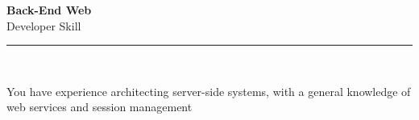 \documentclass[11pt,a4paper]{memoir}
\begin{document}
    \begin{Spacing}{0.75}%
        \noindent
        \Large
        \textbf{Back-End Web}\\[3pt]
        \scriptsize\color{gray}Developer Skill\\ 
        \rule{\textwidth}{.3mm}\\
        
        \vspace{3mm}
        \noindent
        \begin{minipage}[t]{53mm}
            \begin{flushleft}
            {
                \normalsize
                \begin{Spacing}{1}%
                \color{black}\textrm{You have experience architecting server-side systems, with a general knowledge of web services and session management}\\
                \end{Spacing}
            }
            \end{flushleft}
        \end{minipage}

        \vspace{5mm}
        \noindent
        \begin{minipage}[t]{53mm}
            \begin{flushleft}
            {
                \normalsize
                \begin{Spacing}{1}%
                \color{gray}\textit{}\\
                \end{Spacing}
            }
            \end{flushleft}
        \end{minipage}
    \end{Spacing}
    \clearpage
\end{document}
